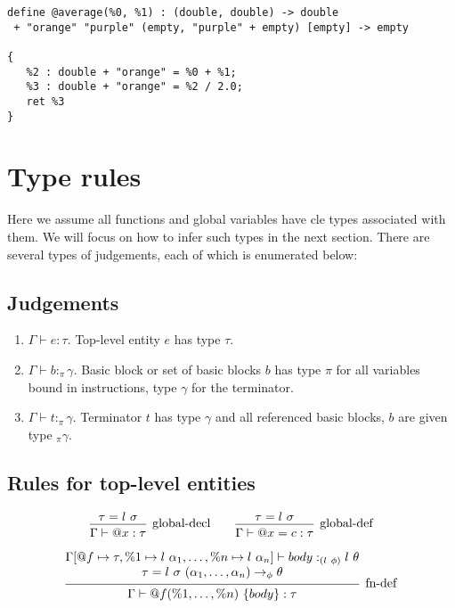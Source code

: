 \documentclass{article}
\begin{document}
\begin{verbatim}
define @average(%0, %1) : (double, double) -> double
 + "orange" "purple" (empty, "purple" + empty) [empty] -> empty
      
{
   %2 : double + "orange" = %0 + %1;
   %3 : double + "orange" = %2 / 2.0;
   ret %3
}
\end{verbatim}

\section{Type rules}
Here we assume all functions and global variables have cle types associated with them.  We will focus on how to infer such types in the next section.
There are several types of judgements, each of which is enumerated below:

\subsection{Judgements}
\begin{enumerate}
    \item $\Gamma \vdash e : \tau$. 
    Top-level entity $e$ has type $\tau$. 
    \item $\Gamma \vdash b :_\pi \gamma$. 
    Basic block or set of basic blocks $b$ has type $\pi$ for all variables bound in instructions, type $\gamma$ for the terminator.
    \item $\Gamma \vdash t :_\pi \gamma$. 
    Terminator $t$ has type $\gamma$ and all referenced basic blocks, $b$ are given type $_\pi \gamma$.
\end{enumerate}

\subsection{Rules for top-level entities}

\[    
\begin{prooftree}
    \hypo{\tau = l\ \sigma}
    \infer1[global-decl]{\Gamma \vdash @x : \tau}
\end{prooftree}
\qquad
\begin{prooftree}
    \hypo{\tau = l\ \sigma}
    \infer1[global-def]{\Gamma \vdash @x = c : \tau}
\end{prooftree}
\]

\[
\begin{prooftree}
    \hypo{
    \begin{matrix}
        \Gamma[@f \mapsto \tau, \%1 \mapsto l\ \alpha_1, \ldots, \%n \mapsto l\ \alpha_n] \vdash body :_{(l\ \phi)} l\ \theta \\
        \tau = l\ \sigma\ (\alpha_1, \dots, \alpha_n) \rightarrow_\phi \theta
    \end{matrix}
    }
    \infer1[fn-def]{\Gamma \vdash @f(\%1, \dots, \%n)\ \{ body \} : \tau}
    
\end{prooftree}
\]
\end{document}
